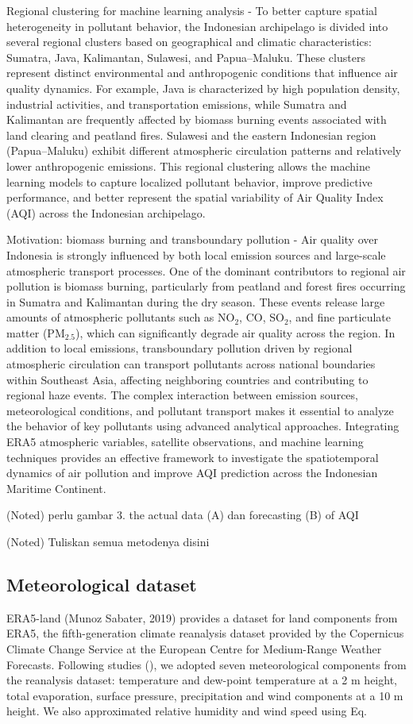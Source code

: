 \documentclass[pdflatex,sn-mathphys-num]{sn-jnl}%
\theoremstyle{thmstyleone}%
\theoremstyle{thmstyletwo}%
\theoremstyle{thmstylethree}%
\begin{document}
Regional clustering for machine learning analysis - To better capture spatial heterogeneity in pollutant behavior, the Indonesian archipelago is divided into several regional clusters based on geographical and climatic characteristics: Sumatra, Java, Kalimantan, Sulawesi, and Papua–Maluku. These clusters represent distinct environmental and anthropogenic conditions that influence air quality dynamics. For example, Java is characterized by high population density, industrial activities, and transportation emissions, while Sumatra and Kalimantan are frequently affected by biomass burning events associated with land clearing and peatland fires. Sulawesi and the eastern Indonesian region (Papua–Maluku) exhibit different atmospheric circulation patterns and relatively lower anthropogenic emissions. This regional clustering allows the machine learning models to capture localized pollutant behavior, improve predictive performance, and better represent the spatial variability of Air Quality Index (AQI) across the Indonesian archipelago.

Motivation: biomass burning and transboundary pollution - Air quality over Indonesia is strongly influenced by both local emission sources and large-scale atmospheric transport processes. One of the dominant contributors to regional air pollution is biomass burning, particularly from peatland and forest fires occurring in Sumatra and Kalimantan during the dry season. These events release large amounts of atmospheric pollutants such as NO$_2$, CO, SO$_2$, and fine particulate matter (PM$_{2.5}$), which can significantly degrade air quality across the region. In addition to local emissions, transboundary pollution driven by regional atmospheric circulation can transport pollutants across national boundaries within Southeast Asia, affecting neighboring countries and contributing to regional haze events. The complex interaction between emission sources, meteorological conditions, and pollutant transport makes it essential to analyze the behavior of key pollutants using advanced analytical approaches. Integrating ERA5 atmospheric variables, satellite observations, and machine learning techniques provides an effective framework to investigate the spatiotemporal dynamics of air pollution and improve AQI prediction across the Indonesian Maritime Continent.


(Noted) perlu gambar 3. the actual data (A) dan forecasting (B) of AQI

(Noted) Tuliskan semua metodenya disini

\subsection{Meteorological dataset}
ERA5-land (Munoz Sabater, 2019) provides a dataset for land components from ERA5, the fifth-generation climate reanalysis dataset provided by the Copernicus Climate Change Service at the European Centre for Medium-Range Weather Forecasts. Following studies (), we adopted seven meteorological components from the reanalysis dataset: temperature and dew-point temperature at a 2 m height, total evaporation, surface pressure, precipitation and wind components at a 10 m height. We also approximated relative humidity and wind speed using Eq.
\end{document}
